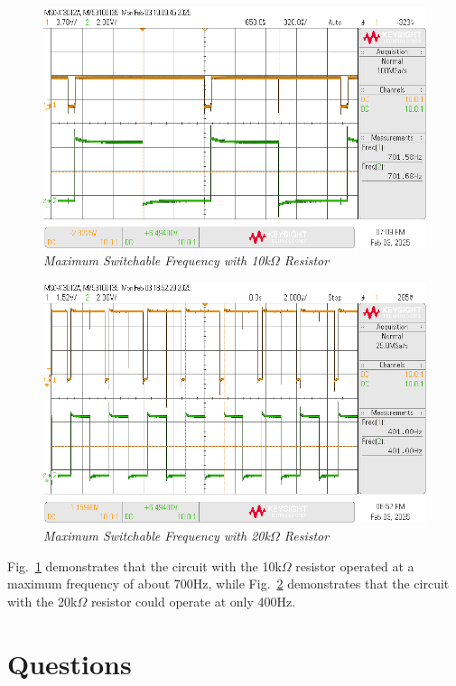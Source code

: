 \documentclass[conference]{IEEEtran}
\begin{document}
\begin{figure}[!ht]
    \centering
    \includegraphics[width=\linewidth]{images/10k Before Good.png}
    \caption{\textit{Maximum Switchable Frequency with 10k$\Omega$ Resistor}}
    \label{fig:maxFreq10k}
\end{figure}

\begin{figure}[!ht]
    \centering
    \includegraphics[width=\linewidth]{images/20k Before.png}
    \caption{\textit{Maximum Switchable Frequency with 20k$\Omega$ Resistor}}
    \label{fig:maxFreq20k}
\end{figure}

Fig.~\ref{fig:maxFreq10k} demonstrates that the circuit with the 10k$\Omega$
resistor operated at a maximum frequency of about 700Hz, while Fig.~\ref{fig:maxFreq20k}
demonstrates that the circuit with the 20k$\Omega$ resistor could operate at only 400Hz.

\section{Questions}
\end{document}
